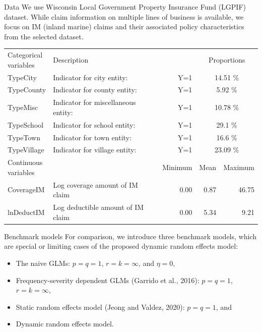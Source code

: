 \documentclass[ignorenonframetext,]{beamer}
\begin{document}
\begin{frame}{Data}
\rmfamily
We use Wisconsin Local Government Property Insurance Fund (LGPIF) dataset.
While claim information on multiple lines of business is available, we focus on IM (inland marine) claims and their associated policy characteristics from the selected dataset.

\vspace{1em}
\centering
\scriptsize
\begin{tabular}{l|lrrr}
\hline
\makecell[l]{Categorical\\variables} & Description & & \multicolumn{2}{c}{Proportions} \\
TypeCity & Indicator for city entity: & Y=1 & \multicolumn{2}{c}{14.51 \%} \\
TypeCounty & Indicator for county entity: & Y=1 & \multicolumn{2}{c}{5.92 \%} \\
TypeMisc & Indicator for miscellaneous entity: & Y=1 & \multicolumn{2}{c}{10.78 \%} \\
TypeSchool & Indicator for school entity: & Y=1 & \multicolumn{2}{c}{29.1 \%} \\
TypeTown & Indicator for town entity: & Y=1 & \multicolumn{2}{c}{16.6 \%} \\
TypeVillage & Indicator for village entity: & Y=1 & \multicolumn{2}{c}{23.09 \%} \\
\hline
\makecell[l]{Continuous\\variables} & & Minimum & Mean & Maximum \\
CoverageIM & Log coverage amount of IM claim & 0.00 & 0.87 & 46.75 \\
lnDeductIM & Log deductible amount of IM claim & 0.00 & 5.34 & 9.21 \\
\hline\hline
\end{tabular}
\end{frame}

\begin{frame}{Benchmark models}
For comparison, we introduce three benchmark models, which are special or limiting cases of the proposed dynamic random effects model:
\begin{itemize}
\item The naive GLMs: $p=q=1$, $r=k=\infty$, and $\eta=0$,
\item Frequency-severity dependent GLMs (Garrido et al., 2016): $p=q=1$, $r=k=\infty$,
\item Static random effects model (Jeong and Valdez, 2020): $p=q=1$, and
\item Dynamic random effects model.
\end{itemize}
\end{frame}
\end{document}
